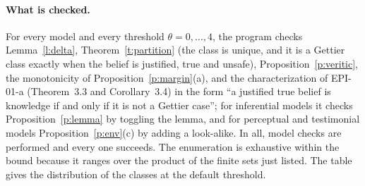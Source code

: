 \documentclass{situationist-preprint}
\begin{document}
\paragraph{What is checked.} For every model and every threshold $\theta = 0, \ldots, 4$, the program checks Lemma~\ref{l:delta}, Theorem~\ref{t:partition} (the class is unique, and it is a Gettier class exactly when the belief is justified, true and unsafe), Proposition~\ref{p:veritic}, the monotonicity of Proposition~\ref{p:margin}(a), and the characterization of EPI-01-a (Theorem~3.3 and Corollary~3.4) in the form \enquote{a justified true belief is knowledge if and only if it is not a Gettier case}; for inferential models it checks Proposition~\ref{p:lemma} by toggling the lemma, and for perceptual and testimonial models Proposition~\ref{p:env}(c) by adding a look-alike. In all, \stcnchecks{} model checks are performed and every one succeeds. The enumeration is exhaustive within the bound because it ranges over the product of the finite sets just listed. The table gives the distribution of the classes at the default threshold.


\end{document}
